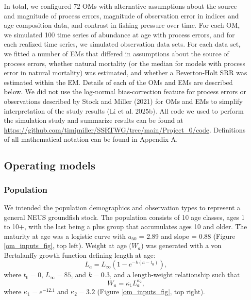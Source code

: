 \documentclass[
  12pt,
]{article}
\begin{document}
In total, we configured 72 OMs with alternative assumptions about the
source and magnitude of process errors, magnitude of observation error
in indices and age composition data, and contrast in fishing pressure
over time. For each OM, we simulated 100 time series of abundance at age
with process errors, and for each realized time series, we simulated
observation data sets. For each data set, we fitted a number of EMs that
differed in assumptions about the source of process errors, whether
natural mortality (or the median for models with process error in
natural mortality) was estimated, and whether a Beverton-Holt SRR was
estimated within the EM. Details of each of the OMs and EMs are
described below. We did not use the log-normal bias-correction feature
for process errors or observations described by Stock and Miller (2021)
for OMs and EMs to simplify interpretation of the study results (Li et
al. 2025b). All code we used to perform the simulation study and
summarize results can be found at
\url{https://github.com/timjmiller/SSRTWG/tree/main/Project_0/code}.
Definitions of all mathematical notation can be found in Appendix A.

\subsection*{Operating models}\label{operating-models}

\subsubsection*{Population}\label{population}

We intended the population demographics and observation types to
represent a general NEUS groundfish stock. The population consists of 10
age classes, ages 1 to 10+, with the last being a plus group that
accumulates ages 10 and older. The maturity at age was a logistic curve
with \(a_{50}\) = 2.89 and slope = 0.88 (Figure \ref{om_inputs_fig}, top
left). Weight at age (\(W_a\)) was generated with a von Bertalanffy
growth function defining length at age: \[
L_a = L_{\infty}\left(1 - e^{-k(a - t_0)}\right),
\] where \(t_0 = 0\), \(L_\infty = 85\), and \(k = 0.3\), and a
length-weight relationship such that \[
W_a = \kappa_1 L_a^{\kappa_2},
\] where \(\kappa_1 = e^{-12.1}\) and \(\kappa_2 = 3.2\) (Figure
\ref{om_inputs_fig}, top right).
\end{document}
